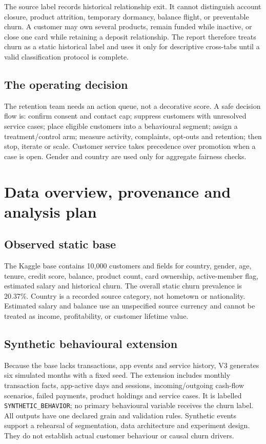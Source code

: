 The source label records historical relationship exit. It cannot distinguish account closure, product attrition, temporary dormancy, balance flight, or preventable churn. A customer may own several products, remain funded while inactive, or close one card while retaining a deposit relationship. The report therefore treats churn as a static historical label and uses it only for descriptive cross-tabs until a valid classification protocol is complete.

\subsection{The operating decision}

The retention team needs an action queue, not a decorative score. A safe decision flow is: confirm consent and contact cap; suppress customers with unresolved service cases; place eligible customers into a behavioural segment; assign a treatment/control arm; measure activity, complaints, opt-outs and retention; then stop, iterate or scale. Customer service takes precedence over promotion when a case is open. Gender and country are used only for aggregate fairness checks.

\section{Data overview, provenance and analysis plan}

\subsection{Observed static base}

The Kaggle base contains 10,000 customers and fields for country, gender, age, tenure, credit score, balance, product count, card ownership, active-member flag, estimated salary and historical churn. The overall static churn prevalence is 20.37\%. Country is a recorded source category, not hometown or nationality. Estimated salary and balance use an unspecified source currency and cannot be treated as income, profitability, or customer lifetime value.

\subsection{Synthetic behavioural extension}

Because the base lacks transactions, app events and service history, V3 generates six simulated months with a fixed seed. The extension includes monthly transaction facts, app-active days and sessions, incoming/outgoing cash-flow scenarios, failed payments, product holdings and service cases. It is labelled \texttt{SYNTHETIC\_BEHAVIOR}; no primary behavioural variable receives the churn label. All outputs have one declared grain and validation rules. Synthetic events support a rehearsal of segmentation, data architecture and experiment design. They do not establish actual customer behaviour or causal churn drivers.

